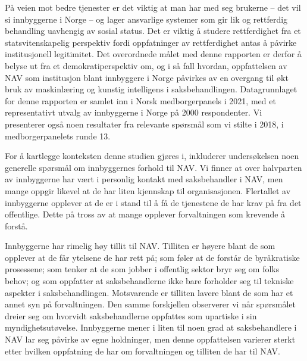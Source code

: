 \documentclass[
  12pt,
  a4paper, 12pt]{article}
\begin{document}
På veien mot bedre tjenester er det viktig at man har med seg brukerne -- det vil si innbyggerne i Norge -- og lager ansvarlige systemer som gir lik og rettferdig behandling uavhengig av sosial status.
Det er viktig å studere rettferdighet fra et statsvitenskapelig perspektiv fordi oppfatninger av rettferdighet antas å påvirke institusjonell legitimitet.
Det overordnede målet med denne rapporten er derfor å belyse ut fra et demokratiperspektiv om, og i så fall hvordan, oppfattelsen av NAV som institusjon blant innbyggere i Norge påvirkes av en overgang til økt bruk av maskinlæring og kunstig intelligens i saksbehandlingen.
Datagrunnlaget for denne rapporten er samlet inn i Norsk medborgerpanels i 2021, med et representativt utvalg av innbyggerne i Norge på 2000 respondenter.
Vi presenterer også noen resultater fra relevante spørsmål som vi stilte i 2018, i medborgerpanelets runde 13.

For å kartlegge konteksten denne studien gjøres i, inkluderer undersøkelsen noen generelle spørsmål om innbyggernes forhold til NAV.
Vi finner at over halvparten av innbyggerne har vært i personlig kontakt med saksbehandler i NAV, men mange oppgir likevel at de har liten kjennskap til organisasjonen.
Flertallet av innbyggerne opplever at de er i stand til å få de tjenestene de har krav på fra det offentlige.
Dette på tross av at mange opplever forvaltningen som krevende å forstå.

Innbyggerne har rimelig høy tillit til NAV.
Tilliten er høyere blant de som opplever at de får ytelsene de har rett på; som føler at de forstår de byråkratiske prosessene; som tenker at de som jobber i offentlig sektor bryr seg om folks behov; og som oppfatter at saksbehandlerne ikke bare forholder seg til tekniske aspekter i saksbehandlingen.
Motsvarende er tilliten lavere blant de som har et annet syn på forvaltningen.
Den samme forskjellen observerer vi når spørsmålet dreier seg om hvorvidt saksbehandlerne oppfattes som upartiske i sin myndighetsutøvelse.
Innbyggerne mener i liten til noen grad at saksbehandlere i NAV lar seg påvirke av egne holdninger, men denne oppfattelsen varierer sterkt etter hvilken oppfatning de har om forvaltningen og tilliten de har til NAV.
\end{document}
